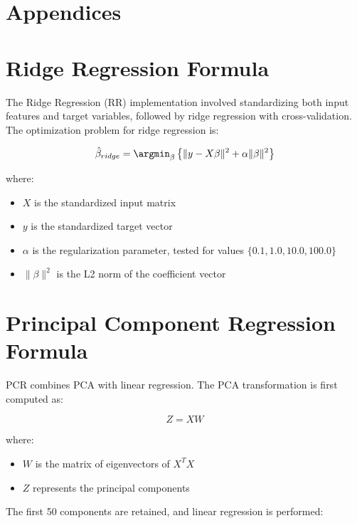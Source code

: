 \documentclass{article}
\begin{document}
\begin{appendices}
\clearpage
\section*{Appendices}

\section{Ridge Regression Formula} \label{app:ridge_regression}
The Ridge Regression (RR) implementation involved standardizing both input features and target variables, followed by ridge regression with cross-validation. The optimization problem for ridge regression is:

\begin{equation}
    \hat{\beta}_{ridge} = \argmin_{\beta} \left\{ \|y - X\beta\|^2 + \alpha\|\beta\|^2 \right\}
\end{equation}

where:
\begin{itemize}
    \item $X$ is the standardized input matrix
    \item $y$ is the standardized target vector
    \item $\alpha$ is the regularization parameter, tested for values $\{0.1, 1.0, 10.0, 100.0\}$
    \item $\|\beta\|^2$ is the L2 norm of the coefficient vector
\end{itemize}

\section{Principal Component Regression Formula} \label{app:pcr_regression}
PCR combines PCA with linear regression. The PCA transformation is first computed as:

\begin{equation}
    Z = X W
\end{equation}

where:
\begin{itemize}
    \item $W$ is the matrix of eigenvectors of $X^TX$
    \item $Z$ represents the principal components
\end{itemize}

The first 50 components are retained, and linear regression is performed:


\end{appendices}
\end{document}
